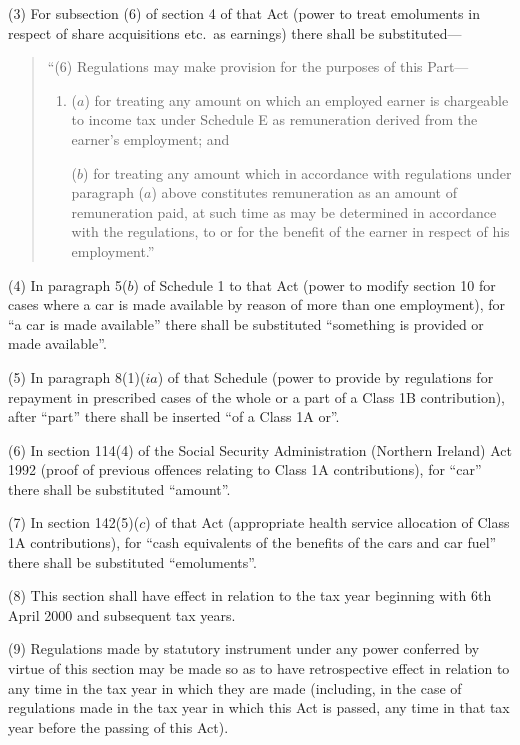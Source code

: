 \documentclass[12pt,a4paper]{article}
\begin{document}
(3) For subsection (6)  of section 4 of that Act (power to treat emoluments in respect of share acquisitions etc.\ as earnings) there shall be substituted—
\begin{quotation}
“(6) Regulations may make provision for the purposes of this Part—
\begin{enumerate}\item[]
($a$) for treating any amount on which an employed earner is chargeable to income tax under Schedule E as remuneration derived from the earner’s employment; and

($b$) for treating any amount which in accordance with regulations under paragraph ($a$)  above constitutes remuneration as an amount of remuneration paid, at such time as may be determined in accordance with the regulations, to or for the benefit of the earner in respect of his employment.”
\end{enumerate}
\end{quotation}

(4) In paragraph 5($b$)  of Schedule 1 to that Act (power to modify section 10 for cases where a car is made available by reason of more than one employment), for “a car is made available” there shall be substituted “something is provided or made available”.

(5) In paragraph 8(1)($ia$) of that Schedule (power to provide by regulations for repayment in prescribed cases of the whole or a part of a Class 1B contribution), after “part” there shall be inserted “of a Class 1A or”.

(6) In section 114(4)  of the Social Security Administration (Northern Ireland) Act 1992 (proof of previous offences relating to Class 1A contributions), for “car” there shall be substituted “amount”.

(7) In section 142(5)($c$)  of that Act (appropriate health service allocation of Class 1A contributions), for “cash equivalents of the benefits of the cars and car fuel” there shall be substituted “emoluments”.

(8) This section shall have effect in relation to the tax year beginning with 6th April 2000 and subsequent tax years.

(9) Regulations made by statutory instrument under any power conferred by virtue of this section may be made so as to have retrospective effect in relation to any time in the tax year in which they are made (including, in the case of regulations made in the tax year in which this Act is passed, any time in that tax year before the passing of this Act).
\end{document}
